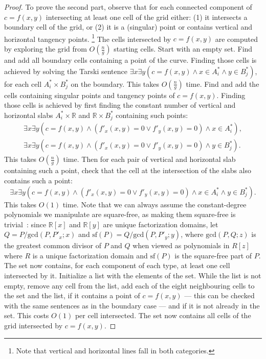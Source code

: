 \begin{proof}
    To prove the second part, observe that for each connected component of
    $c=f(x,y)$ intersecting at least one cell of the grid either: (1) it
    intersects a boundary cell of the grid, or (2) it is a (singular) point or
    contains vertical and horizontal tangency points.%
    \footnote{Note that vertical and horizontal lines fall in both categories.}
    The cells intersected by
    $c=f(x,y)$ are computed by exploring the grid from $O(\frac ng)$ starting cells.
    Start with an empty set. Find and add all boundary cells containing a point of the
    curve. Finding those cells is achieved by solving
    the Tarski sentence
    $\exists x \exists y (
    c=f(x,y)
    \land
    x \in A_i^*
    \land
    y \in B_j^*
    )$,
    for each cell $A_i^* \times B_j^*$ on the boundary.
    This takes $O(\frac ng)$ time.
    Find and add the cells containing singular points and tangency points of
    $c=f(x,y)$. Finding those cells is achieved by first finding
    the constant number of vertical and horizontal slabs $A_i^* \times
    \mathbb{R}$ and $\mathbb{R} \times B_j^*$ containing such points:
    \begin{align*}
        \exists x \exists y (
	c=f(x,y)
	\land
	( f'_x(x,y)=0 \lor f'_y(x,y)=0 )
	\land
	x \in A_i^*), \\
        \exists x \exists y (
	c=f(x,y)
	\land
	( f'_x(x,y)=0 \lor f'_y(x,y)=0 )
	\land
	y \in B_j^*).
    \end{align*}
    This takes $O(\frac ng)$ time.
    Then for each pair of vertical and horizontal slab containing such a point,
    check that the cell at the intersection of the slabs also contains such a
    point:
    \begin{displaymath}
        \exists x \exists y (
	c=f(x,y)
	\land
	( f'_x(x,y)=0 \lor f'_y(x,y)=0 )
	\land
	x \in A_i^*
	\land
	y \in B_j^*
	).
    \end{displaymath}
    This takes $O(1)$ time.
%
Note that we can always assume the constant-degree polynomials we manipulate
are square-free, as making them square-free is trivial~\cite{Y76}: since
$\mathbb{R}[x]$ and $\mathbb{R}[y]$ are unique factorization domains, let $Q =
P/\text{gcd}(P,P'_x;x)$ and $\text{sf}(P) = Q/\text{gcd}(P,P'_y;y)$, where
$\text{gcd}(P,Q;z)$ is the greatest common divisor of $P$ and $Q$ when viewed
as polynomials in $R[z]$ where $R$ is a unique factorization domain and
$\text{sf}(P)$
is the square-free part of $P$.
%
    The set now contains, for each component of each
    type, at least one cell intersected by it. Initialize a list with the
    elements of the set. While the list is not empty, remove any cell from the
    list, add each of the eight neighbouring cells to the set and the list,
    if it contains a point of $c=f(x,y)$ --- this can be checked with the same
    sentences as in the boundary case --- and if
    it is not already in the set. This costs $O(1)$ per cell intersected.
    The set now contains all cells of the grid intersected by $c=f(x,y)$.
\end{proof}

